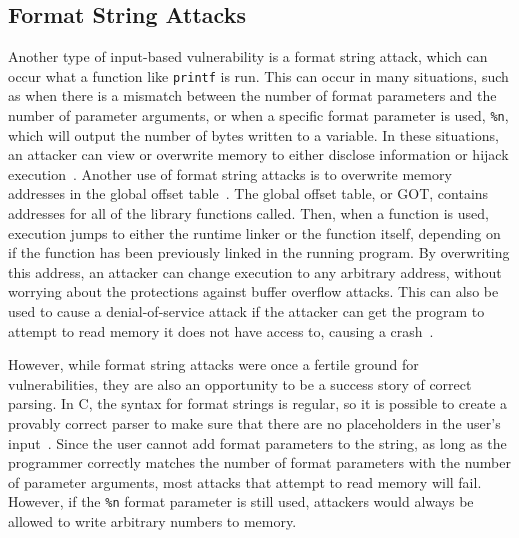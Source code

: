 \subsection{Format String Attacks}
\label{sec:formatStringAttacks}
Another type of input-based vulnerability is a format string attack, which can occur what a function like \texttt{printf} is run.  This can occur in many situations, such as when there is a mismatch between the number of format parameters and the number of parameter arguments, or when a specific format parameter is used, \texttt{\%n}, which will output the number of bytes written to a variable.  In these situations, an attacker can view or overwrite memory to either disclose information or hijack execution~\cite{newsham_2000}.  Another use of format string attacks is to overwrite memory addresses in the global offset table~\cite{scut2001exploiting}.  The global offset table, or GOT, contains addresses for all of the library functions called.  Then, when a function is used, execution jumps to either the runtime linker or the function itself, depending on if the function has been previously linked in the running program.  By overwriting this address, an attacker can change execution to any arbitrary address, without worrying about the protections against buffer overflow attacks.  This can also be used to cause a denial-of-service attack if the attacker can get the program to attempt to read memory it does not have access to, causing a crash~\cite{scut2001exploiting}.

However, while format string attacks were once a fertile ground for vulnerabilities, they are also an opportunity to be a success story of correct parsing.  In C, the syntax for format strings is regular, so it is possible to create a provably correct parser to make sure that there are no  placeholders in the user's input~\cite{sassaman2013security}.  Since the user cannot add format parameters to the string, as long as the programmer correctly matches the number of format parameters with the number of parameter arguments, most attacks that attempt to read memory will fail.  However, if the \texttt{\%n} format parameter is still used, attackers would always be allowed to write arbitrary numbers to memory.


